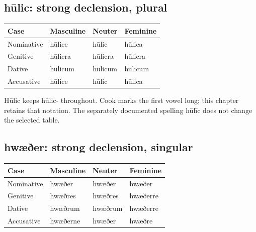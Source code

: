 \subsection*{hūlic: strong declension, plural}

\par\begingroup
\fontsize{10.5}{13.2}\selectfont
\setlength{\LTleft}{0pt}\setlength{\LTright}{\fill}
\noindent
\begin{tabular}{@{}>{\raggedright\arraybackslash}p{28.89mm}>{\raggedright\arraybackslash}p{28.89mm}>{\raggedright\arraybackslash}p{28.89mm}>{\raggedright\arraybackslash}p{28.89mm}@{}}
\toprule
\textbf{Case} & \textbf{Masculine} & \textbf{Neuter} & \textbf{Feminine} \\
\midrule
Nominative & hūlice & hūlic & hūlica \\
Genitive & hūlicra & hūlicra & hūlicra \\
Dative & hūlicum & hūlicum & hūlicum \\
Accusative & hūlice & hūlic & hūlica \\
\bottomrule
\end{tabular}
\par\endgroup

Hūlic keeps hūlic- throughout. Cook marks the first vowel long; this chapter retains that notation. The separately documented spelling hūlīc does not change the selected table.

\subsection*{hwæðer: strong declension, singular}

\par\begingroup
\fontsize{10.5}{13.2}\selectfont
\setlength{\LTleft}{0pt}\setlength{\LTright}{\fill}
\noindent
\begin{tabular}{@{}>{\raggedright\arraybackslash}p{28.89mm}>{\raggedright\arraybackslash}p{28.89mm}>{\raggedright\arraybackslash}p{28.89mm}>{\raggedright\arraybackslash}p{28.89mm}@{}}
\toprule
\textbf{Case} & \textbf{Masculine} & \textbf{Neuter} & \textbf{Feminine} \\
\midrule
Nominative & hwæðer & hwæðer & hwæðer \\
Genitive & hwæðres & hwæðres & hwæðerre \\
Dative & hwæðrum & hwæðrum & hwæðerre \\
Accusative & hwæðerne & hwæðer & hwæðre \\
\bottomrule
\end{tabular}
\par\endgroup

